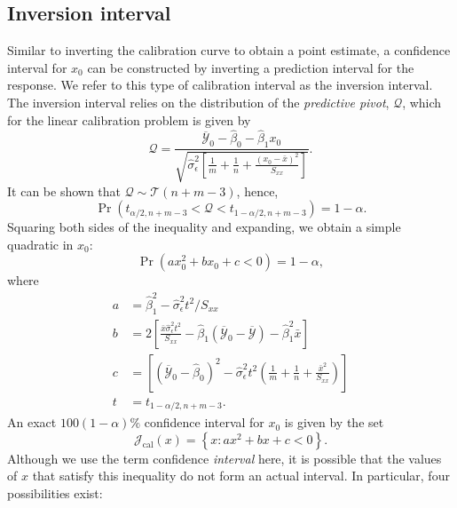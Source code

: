 \documentclass[cmfont,usenames,dvipsnames,leqno]{afit-etd}\usepackage[]{graphicx}\usepackage[]{color}
\newcommand{\mc}[1]{\ensuremath{\mathcal{#1}}}
\newcommand{\wh}[1]{\ensuremath{\widehat{#1}}}
\newcommand{\wb}[1]{\ensuremath{\overline{#1}}}
\newcommand{\tquant}[2]{\ensuremath{t_{#1,#2}}}
\newcommand{\Prob}{\operatorname{Pr}}
\begin{document}
\subsection{Inversion interval}
\label{sec:inversion-interval}
Similar to inverting the calibration curve to obtain a point estimate, a confidence interval for $x_0$ can be constructed by inverting a prediction interval for the response. We refer to this type of calibration interval as the inversion interval. The inversion interval relies on the distribution of the \textit{predictive pivot}, $\mc{Q}$, which for the linear calibration problem is given by
\begin{equation}
\label{eqn:predictive-pivot}
  \mc{Q} = \frac{\wb{\mc{Y}}_0-\wh{\beta}_0-\wh{\beta}_1 x_0}{\sqrt{\wh{\sigma}_\epsilon^2\left[\frac{1}{m}+\frac{1}{n}+\frac{(x_0-\bar{x})^2}{S_{xx}}\right]}}.
\end{equation}
It can be shown \citep{graybill_theory_1976} that $\mc{Q} \sim \mathcal{T}\left(n+m-3\right)$, hence, 
\begin{equation*}
  \Prob\left(\tquant{\alpha/2}{n+m-3} < \mc{Q} < \tquant{1-\alpha/2}{n+m-3}\right) = 1-\alpha.
\end{equation*}
Squaring both sides of the inequality and expanding, we obtain a simple quadratic in $x_0$:
\begin{equation}
\label{eqn:quadratic}
  \Prob\left( a x_0^2 + b x_0 + c < 0 \right) = 1 - \alpha,
\end{equation}
where 
\begin{align*}
  a &= \wh{\beta}_1^2-\wh{\sigma}_\epsilon^2 t^2/S_{xx} \\
  b &= 2\left[\frac{\bar{x}\wh{\sigma}_\epsilon^2 t^2}{S_{xx}}-\wh{\beta}_1\left(\wb{\mc{Y}}_0-\wb{\mc{Y}}\right)-\wh{\beta}_1^2\bar{x}\right] \\
  c &= \left[\left(\wb{\mc{Y}}_0-\wh{\beta}_0\right)^2-\wh{\sigma}_\epsilon^2 t^2\left(\frac{1}{m}+\frac{1}{n}+\frac{\bar{x}^2}{S_{xx}}\right)\right] \\
  t &= \tquant{1-\alpha/2}{n+m-3}.
\end{align*}
An exact $100(1 - \alpha)\%$ confidence interval for $x_0$ is given by the set
\begin{equation}
\label{eqn:quadratic-inequality}
  \mathcal{J}_\mathrm{cal}\left(x\right) = \left\{x: a x^2 + b x + c < 0 \right\}.
\end{equation}
Although we use the term confidence \emph{interval} here, it is possible that the values of $x$ that satisfy this inequality do not form an actual interval. In particular, four possibilities exist: 
\end{document}
